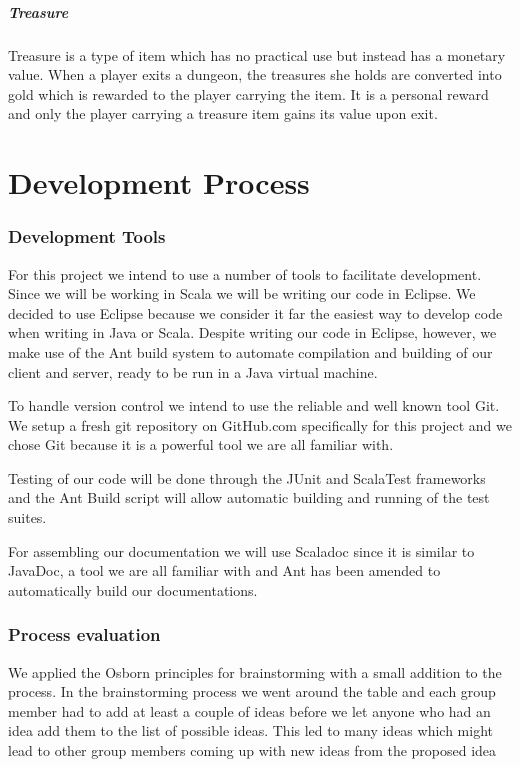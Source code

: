 \documentclass[a4paper]{article}
\begin{document}
\subsubsection{Treasure}
Treasure is a type of item which has no practical use but instead has a monetary value. When a player exits a dungeon, the treasures she holds are converted into gold which is rewarded 
to the player carrying the item. It is a personal reward and only the player carrying a treasure item gains its value upon exit.
\part{Development Process}
\section{Development Tools}
For this project we intend to use a number of tools to facilitate development.
Since we will be working in Scala we will be writing our code in Eclipse. We decided to use Eclipse because we consider it far the easiest way to develop code 
when writing in Java or Scala. Despite writing our code in Eclipse, however, we make use of the Ant build system to automate compilation and building of our client and server, ready 
to be run in a Java virtual machine.
 
To handle version control we intend to use the reliable and well known tool Git. We setup a fresh git repository on GitHub.com specifically for this project and we chose 
Git because it is a powerful tool we are all familiar with.

Testing of our code will be done through the JUnit and ScalaTest frameworks and the Ant Build script will allow automatic building and running of the test suites.

For assembling our documentation we will use Scaladoc since it is similar to JavaDoc, a tool we are all familiar with and Ant has been amended to automatically build our documentations.

\section{Process evaluation}
We applied the Osborn principles for brainstorming with a small addition to the process. In the brainstorming process we went around the table and each group member had 
to add at least a couple of ideas before we let anyone who had an idea add them to the list of possible ideas. This led to many ideas which might lead to other group members 
coming up with new ideas from the proposed idea
\end{document}
